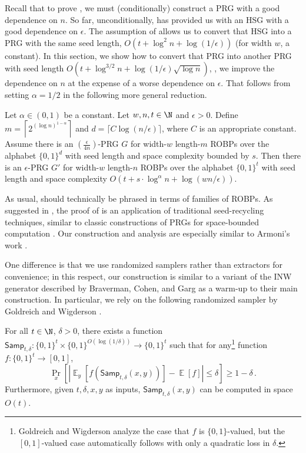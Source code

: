 \documentclass{toc}
\DeclareMathOperator*{\ExpVal}{\mathbb{E}}
\begin{document}
Recall that to prove , we must (conditionally) construct a PRG with a good dependence on $n$. So far, unconditionally,  has provided us with an HSG with a good dependence on $\epsilon$. The assumption of  allows us to convert that HSG into a PRG with the same seed length, $O(t + \log^2 n + \log(1/\epsilon))$ (for width $w$, a constant). In this section, we show how to convert that PRG into another PRG with seed length $O(t + \log^{3/2} n + \log(1/\epsilon) \sqrt{\log n})$, \ie, we improve the dependence on $n$ at the expense of a worse dependence on $\epsilon$. That follows from setting $\alpha = 1/2$ in the following more general reduction.
\begin{lemma} \label{lem:armoni}
Let $\alpha \in (0, 1)$ be a constant. Let $w, n, t \in \N$ and $\epsilon > 0$. Define $m = \left\lceil2^{(\log n)^{1 - \alpha}}\right\rceil$ and $d =  \lceil C\log(n/\epsilon) \rceil$, where $C$ is an appropriate constant. Assume there is an $(\frac{\epsilon}{4n})$-PRG $G$ for width-$w$ length-$m$ ROBPs over the alphabet $\{0, 1\}^d$ with seed length and space complexity bounded by $s$. Then there is an $\epsilon$-PRG $G'$ for width-$w$ length-$n$ ROBPs over the alphabet $\{0, 1\}^t$ with seed length and space complexity $O(t + s \cdot \log^{\alpha} n + \log(wn/\epsilon))$.
\end{lemma}

As usual,  should technically be phrased in terms of families of ROBPs. As suggested in , the proof of  is an application of traditional seed-recycling techniques, similar to classic constructions of PRGs for space-bounded computation \cite{Nis92, INW94, NZ96}. Our construction and analysis are especially similar to Armoni's work \cite{Arm98}.

One difference is that we use randomized samplers rather than extractors for convenience; in this respect, our construction is similar to a variant of the INW generator \cite{INW94} described by Braverman, Cohen, and Garg \cite{BCG20} as a warm-up to their main construction. In particular, we rely on the following randomized sampler by Goldreich and Wigderson \cite{GW97}.

\begin{theorem}[{\cite[Lemma 6.6]{GW97}}] \label{thm:gw}
For all $t \in \N$, $\delta > 0$, there exists a function $\mathsf{Samp}_{t, \delta} \colon \{0, 1\}^t \times \{0, 1\}^{O(\log(1/\delta))} \to \{0, 1\}^t$ such that for any\footnote{Goldreich and Wigderson analyze the case that $f$ is $\{0, 1\}$-valued, but the $[0, 1]$-valued case automatically follows with only a quadratic loss in $\delta$.} function $f \colon \{0, 1\}^t \to [0, 1]$,
$$
\Pr_x\left[\left|\ExpVal_y[f(\mathsf{Samp}_{t, \delta}(x, y))] - \ExpVal[f]\right| \leq \delta\right] \geq 1 - \delta\,.
$$
Furthermore, given $t, \delta, x, y$ as inputs, $\mathsf{Samp}_{t, \delta}(x, y)$ can be computed in space $O(t)$.
\end{theorem}
\end{document}
